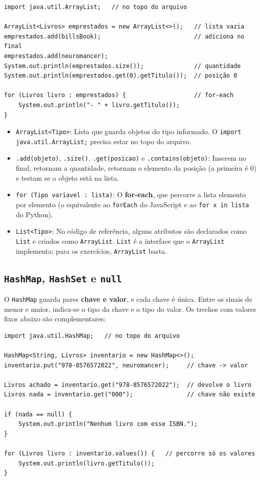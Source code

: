\begin{lstlisting}[style=java]
import java.util.ArrayList;   // no topo do arquivo

ArrayList<Livros> emprestados = new ArrayList<>();   // lista vazia
emprestados.add(billsBook);                          // adiciona no final
emprestados.add(neuromancer);
System.out.println(emprestados.size());              // quantidade
System.out.println(emprestados.get(0).getTitulo());  // posição 0

for (Livros livro : emprestados) {                   // for-each
    System.out.println("- " + livro.getTitulo());
}
\end{lstlisting}

\begin{itemize}
    \item \texttt{ArrayList<Tipo>}: Lista que guarda objetos do tipo informado. O
    \texttt{import java.util.ArrayList;} precisa estar no topo do arquivo.

    \item \texttt{.add(objeto)}, \texttt{.size()}, \texttt{.get(posicao)} e
    \texttt{.contains(objeto)}: Inserem no final, retornam a quantidade, retornam o elemento da
    posição (a primeira é 0) e testam se o objeto está na lista.

    \item \texttt{for (Tipo variavel : lista)}: O \textbf{for-each}, que percorre a lista
    elemento por elemento (o equivalente ao \texttt{forEach} do JavaScript e ao \texttt{for x in
    lista} do Python).

    \item \texttt{List<Tipo>}: No código de referência, alguns atributos são declarados como
    \texttt{List} e criados como \texttt{ArrayList}. \texttt{List} é a interface que o
    \texttt{ArrayList} implementa; para os exercícios, \texttt{ArrayList} basta.
\end{itemize}

\subsection{\texttt{HashMap}, \texttt{HashSet} e \texttt{null}}

O \texttt{HashMap} guarda pares \textbf{chave e valor}, e cada chave é única. Entre os sinais de
menor e maior, indica-se o tipo da chave e o tipo do valor. Os trechos com valores fixos abaixo
são complementares:

\begin{lstlisting}[style=java]
import java.util.HashMap;   // no topo do arquivo

HashMap<String, Livros> inventario = new HashMap<>();
inventario.put("978-8576572022", neuromancer);     // chave -> valor

Livros achado = inventario.get("978-8576572022");  // devolve o livro
Livros nada = inventario.get("000");               // chave não existe

if (nada == null) {
    System.out.println("Nenhum livro com esse ISBN.");
}

for (Livros livro : inventario.values()) {   // percorre só os valores
    System.out.println(livro.getTitulo());
}
\end{lstlisting}

